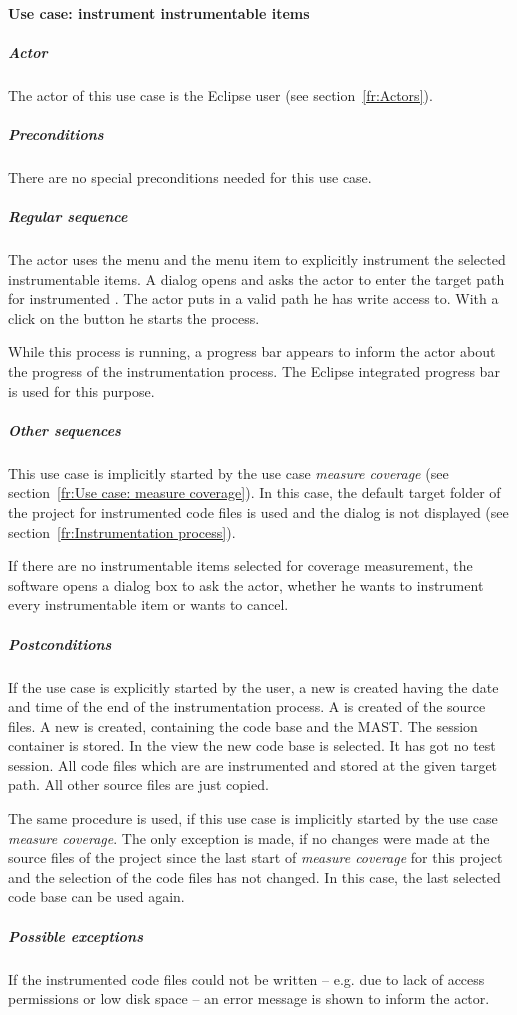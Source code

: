 \paragraph{Use case: instrument instrumentable items} \label{fr:Use case: instrument instrumentable items}
\subparagraph{Actor}
The actor of this use case is the Eclipse user (see section~\ref{fr:Actors}).
\subparagraph{Preconditions}
There are no special preconditions needed for this use case.
\subparagraph{Regular sequence}
The actor uses the menu  and the menu item  to explicitly instrument the selected instrumentable items. A dialog opens and asks the actor to enter the target path for instrumented . The actor puts in a valid path he has write access to. With a click on the button  he starts the  process.
\par
While this process is running, a progress bar appears to inform the actor about the progress of the instrumentation process. The Eclipse integrated progress bar is used for this purpose.
\subparagraph{Other sequences}
This use case is implicitly started by the use case \textit{measure coverage} (see section~\ref{fr:Use case: measure coverage}). In this case, the default target folder of the project for instrumented code files is used and the dialog is not displayed (see section~\ref{fr:Instrumentation process}).
\par
If there are no instrumentable items selected for coverage measurement, the software opens a dialog box to ask the actor, whether he wants to instrument every instrumentable item or wants to cancel.
\subparagraph{Postconditions}
If the use case is explicitly started by the user, a new  is created having the date and time of the end of the instrumentation process. A  is created of the source files. A new  is created, containing the code base and the MAST. The session container is stored. In the  view the new code base is selected. It has got no test session. All code files which are  are instrumented and stored at the given target path. All other source files are just copied.
\par
The same procedure is used, if this use case is implicitly started by the use case \textit{measure coverage}. The only exception is made, if no changes were made at the source files of the project since the last start of \textit{measure coverage} for this project and the selection of the code files  has not changed. In this case, the last selected code base can be used again.
\subparagraph{Possible exceptions}
If the instrumented code files could not be written -- e.g. due to lack of access permissions or low disk space -- an error message is shown to inform the actor.

